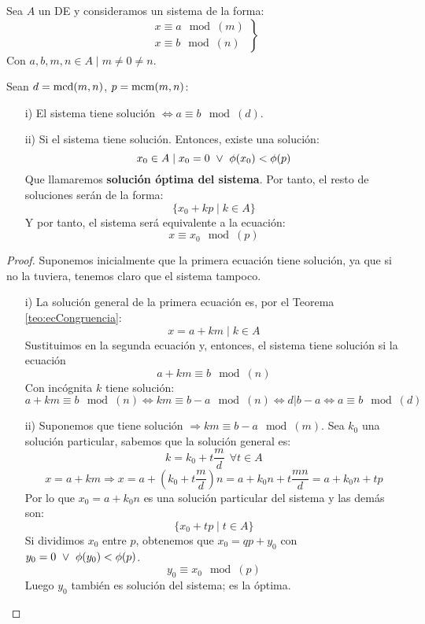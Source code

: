 \begin{teo}
    Sea $A$ un DE y consideramos un sistema de la forma:
    $$\left. \begin{array}{l}
            x\equiv a\mod(m) \\
            x\equiv b\mod(n)
        \end{array} \right\}$$
    Con $a,b,m,n \in A \mid m\neq0\neq n$.\newline

    \noindent
    Sean $d=\operatorname{mcd}(m,n)$, $p=\operatorname{mcm}(m,n)$:
    \begin{enumerate}
        \item[i)] El sistema tiene solución $\Longleftrightarrow a\equiv b\mod(d)$.
        \item[ii)] Si el sistema tiene solución. Entonces, existe una solución: $$x_0 \in A \mid x_0=0 \ \lor \  \phi(x_0)<\phi(p)$$
            Que llamaremos \textbf{solución óptima del sistema}. Por tanto, el resto de soluciones serán de la forma:
            $$\{x_0+kp \mid k \in A\}$$
            Y por tanto, el sistema será equivalente a la ecuación:
            $$x\equiv x_0\mod(p)$$
    \end{enumerate}
\begin{proof}
    Suponemos inicialmente que la primera ecuación tiene solución, ya que si no la tuviera, tenemos claro que el sistema tampoco.\newline
    \begin{enumerate}
        \item[i)] La solución general de la primera ecuación es, por el Teorema \ref{teo:ecCongruencia}: $$x=a+km \mid k \in A$$
                Sustituimos en la segunda ecuación y, entonces, el sistema tiene solución si la ecuación
                $$a+km\equiv b\mod(n)$$
                Con incógnita $k$ tiene solución:
                $$a+km\equiv b\mod(n) \Longleftrightarrow km\equiv b-a\mod(n) \Longleftrightarrow d|b-a \Longleftrightarrow a\equiv b\mod(d)$$
        \item[ii)] Suponemos que tiene solución $\Longrightarrow km\equiv b-a\mod(m)$.\newline
                Sea $k_0$ una solución particular, sabemos que la solución general es: $$k=k_0+t\dfrac{m}{d}~~\forall t \in A$$
                $$x=a+km \Longrightarrow x=a+\left( k_0 + t\dfrac{m}{d} \right)n = a+k_0n + t\dfrac{mn}{d} = a+k_0n + tp$$
                Por lo que $x_0 = a+k_0n$ es una solución particular del sistema y las demás son:
                $$\{x_0 + tp \mid t \in A\}$$
                Si dividimos $x_0$ entre $p$, obtenemos que $x_0=qp+y_0$ con $y_0=0 \ \lor \  \phi(y_0)<\phi(p)$.
                $$y_0\equiv x_0\mod(p)$$
                Luego $y_0$ también es solución del sistema; es la óptima.
    \end{enumerate}
\end{proof}
\end{teo}

